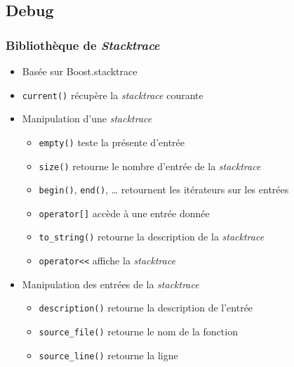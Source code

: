 \documentclass[C++.tex]{subfiles}
\begin{document}
\subsection*{Debug}
\begin{frame}[fragile]
	\frametitle{Bibliothèque de \textit{Stacktrace}}
	\begin{itemize}
		\item Basée sur Boost.stacktrace
		\item \lstinline|current()| récupère la \textit{stacktrace} courante
		\item Manipulation d'une \textit{stacktrace}
		\begin{itemize}
			\item \lstinline|empty()| teste la présente d'entrée
			\item \lstinline|size()| retourne le nombre d'entrée de la \textit{stacktrace}
			\item \lstinline|begin()|, \lstinline|end()|, \ldots{} retournent les itérateurs sur les entrées
			\item \lstinline|operator[]| accède à une entrée donnée
			\item \lstinline|to_string()| retourne la description de la \textit{stacktrace}
			\item \lstinline|operator<<| affiche la \textit{stacktrace}
		\end{itemize}
		\item Manipulation des entrées de la \textit{stacktrace}
		\begin{itemize}
			\item \lstinline|description()| retourne la description de l'entrée
			\item \lstinline|source_file()| retourne le nom de la fonction
			\item \lstinline|source_line()| retourne la ligne
		\end{itemize}
	\end{itemize}
\end{frame}
\end{document}
